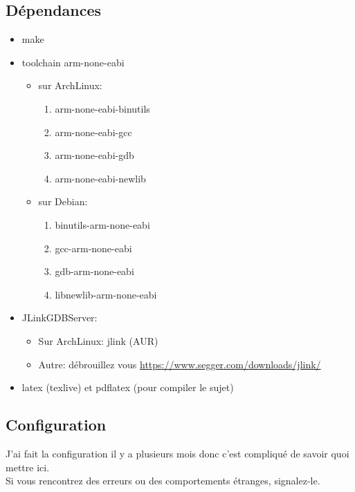 \documentclass[a4paper,10pt]{article} %
\begin{document}
\subsection{\label{dependances}Dépendances}
\begin{itemize}[label=$\bullet$]
    \item make
    \item toolchain arm-none-eabi
    \begin{itemize}
        \item sur ArchLinux:
        \begin{enumerate}
            \item arm-none-eabi-binutils
            \item arm-none-eabi-gcc
            \item arm-none-eabi-gdb
            \item arm-none-eabi-newlib
        \end{enumerate}
        \item sur Debian:
        \begin{enumerate}
            \item binutils-arm-none-eabi
            \item gcc-arm-none-eabi
            \item gdb-arm-none-eabi
            \item libnewlib-arm-none-eabi
        \end{enumerate}
    \end{itemize}
    \item JLinkGDBServer:
    \begin{itemize}
        \item Sur ArchLinux: jlink (AUR)
        \item Autre: débrouillez vous \href{https://www.segger.com/downloads/jlink/#J-LinkSoftwareAndDocumentationPack}{https://www.segger.com/downloads/jlink/}
    \end{itemize}
    \item latex (texlive) et pdflatex (pour compiler le sujet)
\end{itemize}

\subsection{\label{config}Configuration}
J'ai fait la configuration il y a plusieurs mois donc c'est compliqué de savoir quoi mettre ici.\\

Si vous rencontrez des erreurs ou des comportements étranges, signalez-le.\\
\end{document}
